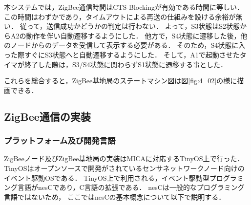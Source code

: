 \documentclass[12pt]{jreport}
\begin{document}
本システムでは，ZigBee通信時間はCTS-Blockingが有効である時間に等しい．
この時間はわずかであり，タイムアウトによる再送の仕組みを設ける余裕が無い．
従って，送信成功かどうかの判定は行わない．
よって，S3状態はS2状態からA2の動作を伴い自動遷移するようにした．
他方で，S4状態に遷移した後，他のノードからのデータを受信して表示する必要がある．
そのため，S4状態に入った際すぐにS3状態へと自動遷移するようにした．
そして，A1で起動させたタイマが終了した際は，S3/S4状態に関わらずS1状態に遷移する事とした．

これらを総合すると，ZigBee基地局のステートマシン図は図\ref{fig:4_02}の様に描画できる．

\subsection{ZigBee通信の実装}

\subsubsection{プラットフォーム及び開発言語}

ZigBeeノード及びZigBee基地局の実装はMICAに対応するTinyOS上で行った．
TinyOSはオープンソースで開発がされているセンサネットワークノード向けのイベント駆動OSである．
TinyOS上で利用される，イベント駆動型プログラミング言語がnesCであり，C言語の拡張である．
nesCは一般的なプログラミング言語ではないため，
ここではnesCの基本概念について以下で説明する．
\end{document}
